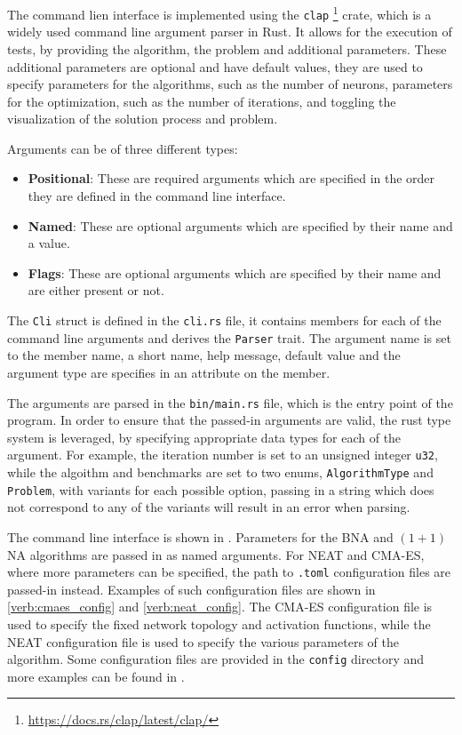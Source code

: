 The command lien interface is implemented using the \texttt{clap} \footnote{\url{https://docs.rs/clap/latest/clap/}} crate, which is a widely used command
line argument parser in Rust. It allows for the execution of tests, by providing the algorithm, the problem and additional parameters. These additional parameters
are optional and have default values, they are used to specify parameters for the algorithms, such as the number of neurons, parameters for the optimization,
such as the number of iterations, and toggling the visualization of the solution process and problem.

Arguments can be of three different types:

\begin{itemize}
    \item \textbf{Positional}: These are required arguments which are specified in the order they are defined in the command line interface.
    \item \textbf{Named}: These are optional arguments which are specified by their name and a value.
    \item \textbf{Flags}: These are optional arguments which are specified by their name and are either present or not.
\end{itemize}

The \texttt{Cli} struct is defined in the \texttt{cli.rs} file, it contains members for each of the command line arguments and derives the \texttt{Parser} trait.
The argument name is set to the member name, a short name, help message, default value and the argument type are specifies in an attribute on the member.

The arguments are parsed in the \texttt{bin/main.rs} file, which is the entry point of the program.
In order to ensure that the passed-in arguments are valid, the rust type system is leveraged, by specifying appropriate data types for each of the argument.
For example, the iteration number is set to an unsigned integer \texttt{u32}, while the algoithm and benchmarks are set to two enums, \texttt{AlgorithmType} and
\texttt{Problem}, with variants for each possible option, passing in a string which does not correspond to any of the variants will result in an error when parsing.

The command line interface is shown in . Parameters for the BNA and $(1 + 1)$ NA algorithms are passed in as named arguments. For NEAT and CMA-ES, where more
parameters can be specified, the path to \texttt{.toml} configuration files are passed-in instead. Examples of such configuration files are shown in \ref{verb:cmaes_config}
and \ref{verb:neat_config}. The CMA-ES configuration file is used to specify the fixed network topology and activation functions, while the NEAT configuration file
is used to specify the various parameters of the algorithm. Some configuration files are provided in the \texttt{config} directory and more examples can be found in
.

